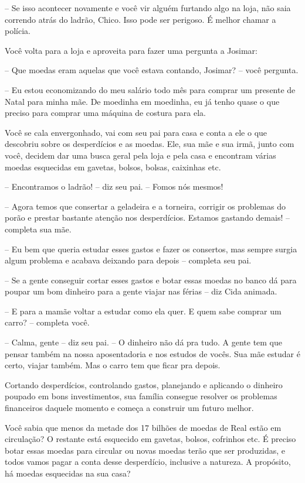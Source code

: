 -- Se isso acontecer novamente e você vir alguém furtando algo na loja, não saia correndo atrás do ladrão, Chico. Isso pode ser perigoso. É melhor chamar a polícia.

Você volta para a loja e aproveita para fazer uma pergunta a Josimar:

-- Que moedas eram aquelas que você estava contando, Josimar? -- você pergunta.

-- Eu estou economizando do meu salário todo mês para comprar um presente de Natal para minha mãe. De moedinha em moedinha, eu já tenho quase o que preciso para comprar uma máquina de costura para ela.

Você se cala envergonhado, vai com seu pai para casa e conta a ele o que descobriu sobre os desperdícios e as moedas. Ele, sua mãe e sua irmã, junto com você, decidem dar uma busca geral pela loja e pela casa e encontram várias moedas esquecidas em gavetas, bolsos, bolsas, caixinhas etc.

-- Encontramos o ladrão! -- diz seu pai. -- Fomos nós mesmos!

-- Agora temos que consertar a geladeira e a torneira, corrigir os problemas do porão e prestar bastante atenção nos desperdícios. Estamos gastando demais! -- completa sua mãe.

-- Eu bem que queria estudar esses gastos e fazer os consertos, mas sempre surgia algum problema e acabava deixando para depois -- completa seu pai.

-- Se a gente conseguir cortar esses gastos e botar essas moedas no banco dá para poupar um bom dinheiro para a gente viajar nas férias -- diz Cida animada.

-- E para a mamãe voltar a estudar como ela quer. E quem sabe comprar um carro? -- completa você.

-- Calma, gente -- diz seu pai. -- O dinheiro não dá pra tudo. A gente tem que pensar também na nossa aposentadoria e nos estudos de vocês. Sua mãe estudar é certo, viajar também. Mas o carro tem que ficar pra depois.

Cortando desperdícios, controlando gastos, planejando e aplicando o dinheiro poupado em bons investimentos, sua família consegue resolver os problemas financeiros daquele momento e começa a construir um futuro melhor.

Você sabia que menos da metade dos 17 bilhões de moedas de Real estão em circulação? O restante está esquecido em gavetas, bolsos, cofrinhos etc. É preciso botar essas moedas para circular ou novas moedas terão que ser produzidas, e todos vamos pagar a conta desse desperdício, inclusive a natureza. A propósito, há moedas esquecidas na sua casa?

